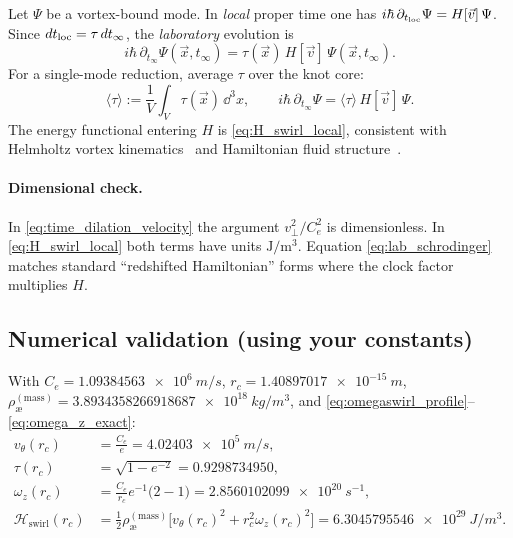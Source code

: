 \documentclass[12pt]{article}
\newcommand{\Ce}{C_e}
\newcommand{\rc}{r_c}
\newcommand{\rhoa}{\rho_{\text{\ae}}^{(\text{mass})}}
\begin{document}
\begin{tcolorbox}[enhanced, breakable, sharp corners, colback=gray!2, colframe=black!40, title={Swirl-Based Hamiltonian, Time Dilation, and Emergent Geometry in VAM}]
        Let \(\Psi\) be a vortex-bound mode. In \emph{local} proper time one has \(i\hbar\,\partial_{t_{\rm loc}}\Psi=H[\vec{v}]\,\Psi\). Since \(dt_{\rm loc}=\tau\,dt_\infty\), the \emph{laboratory} evolution is
        \begin{equation}
            i\hbar\,\partial_{t_\infty}\Psi(\vec{x},t_\infty)=\tau(\vec{x})\,H[\vec{v}]\,\Psi(\vec{x},t_\infty).
            \label{eq:lab_schrodinger}
        \end{equation}
        For a single-mode reduction, average \(\tau\) over the knot core:
        \begin{equation}
            \langle\tau\rangle:=\frac{1}{V}\int_V \tau(\vec{x})\,\dd^3x,
            \qquad
            i\hbar\,\partial_{t_\infty}\Psi=\langle\tau\rangle\,H[\vec{v}]\,\Psi.
        \end{equation}
        The energy functional entering \(H\) is \eqref{eq:H_swirl_local}, consistent with Helmholtz vortex kinematics~\cite{Helmholtz1858} and Hamiltonian fluid structure~\cite{Morrison1998,Salmon1988}.

        \paragraph{Dimensional check.}
        In \eqref{eq:time_dilation_velocity} the argument \(v_\perp^2/\Ce^2\) is dimensionless. In \eqref{eq:H_swirl_local} both terms have units \(\mathrm{J/m^3}\). Equation \eqref{eq:lab_schrodinger} matches standard “redshifted Hamiltonian” forms where the clock factor multiplies \(H\).

        \subsection{Numerical validation (using your constants)}
        \label{subsec:numerics}

        With \(\Ce=\SI{1.09384563e6}{m/s}\), \(\rc=\SI{1.40897017e-15}{m}\), \(\rhoa=\SI{3.8934358266918687e18}{kg/m^3}\), and \eqref{eq:omegaswirl_profile}–\eqref{eq:omega_z_exact}:
        \[
            \begin{aligned}
                v_\theta(\rc)&=\frac{\Ce}{e}=\SI{4.02403e5}{m/s},\\
                \tau(\rc)&=\sqrt{1-e^{-2}}=0.9298734950,\\
                \omega_z(\rc)&=\frac{\Ce}{\rc}e^{-1}\big(2-1\big)=\SI{2.8560102099e20}{s^{-1}},\\
                \mathcal{H}_{\text{swirl}}(\rc)&=\frac{1}{2}\rhoa\Big[v_\theta(\rc)^2+\rc^2\omega_z(\rc)^2\Big]
                =\SI{6.3045795546e29}{J/m^3}.
            \end{aligned}
        \]


\end{tcolorbox}
\end{document}
